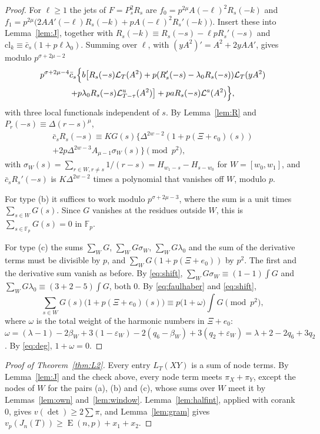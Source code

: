 \documentclass[11pt]{amsart}
\theoremstyle{definition}
\theoremstyle{remark}
\numberwithin{equation}{section}
\newcommand{\F}{\mathbb F}
\newcommand{\cL}{\mathcal L}
\newcommand{\Lex}{\operatorname{E}}
\begin{document}
\begin{proof}
For $\ell\ge1$ the jets of $F=P_s^2R_s$ are $f_0=p^{2\mu}A(-\ell)^2R_s(-k)$ and
$f_1=p^{2\mu}\bigl(2AA'(-\ell)R_s(-k)+pA(-\ell)^2R_s'(-k)\bigr)$. Insert these into Lemma~\ref{lem:J}, together with
$R_s(-k)\equiv R_s(-s)-\ell pR_s'(-s)$ and $\mathrm{cl}_k\equiv\bar c_s(1+p\ell\lambda_0)$. Summing over $\ell$, with
$(yA^2)'=A^2+2yAA'$, gives modulo $p^{\sigma+2\mu-2}$
\begin{multline*}
 p^{\sigma+2\mu-4}\bar c_s\Bigl\{b\bigl[R_s(-s)\cL_T(A^2)+p(R_s'(-s)-\lambda_0R_s(-s))\cL_T(yA^2)\\
 +p\lambda_0R_s(-s)\cL^u_{T-\tau}(A^2)\bigr]+paR_s(-s)\cL^a(A^2)\Bigr\},
\end{multline*}
with three local functionals independent of $s$. By Lemma~\ref{lem:R} and $P_r(-s)\equiv\Delta(r-s)^\mu$,
\begin{multline*}
 \bar c_sR_s(-s)\equiv KG(s)\bigl\{\Delta^{2w-2}(1+p(\Xi+e_0)(s))\\
 +2p\Delta^{2w-3}A_{\mu-1}\sigma_W(s)\bigr\}\pmod{p^2},
\end{multline*}
with $\sigma_W(s)=\sum_{r\in W,r\ne s}1/(r-s)=H_{w_1-s}-H_{s-w_0}$ for $W=[w_0,w_1]$, and $\bar c_sR_s'(-s)$ is $K\Delta^{2w-2}$
times a polynomial that vanishes off $W$, modulo $p$.

For type (b) it suffices to work modulo $p^{\sigma+2\mu-3}$, where the sum is a unit times $\sum_{s\in W}G(s)$. Since
$G$ vanishes at the residues outside $W$, this is $\sum_{s\in\F_p}G(s)=0$ in $\F_p$.

For type (c) the sums $\sum_WG$, $\sum_WG\sigma_W$, $\sum_WG\lambda_0$ and the sum of the derivative terms must be
divisible by $p$, and $\sum_WG(1+p(\Xi+e_0))$ by $p^2$. The first and the derivative sum vanish as before. By
\eqref{eq:shift}, $\sum_WG\sigma_W\equiv(1-1)\int G$ and $\sum_WG\lambda_0\equiv(3+2-5)\int G$, both $0$. By
\eqref{eq:faulhaber} and \eqref{eq:shift},
\[
 \sum_{s\in W}G(s)\bigl(1+p(\Xi+e_0)(s)\bigr)\equiv p\bigl(1+\omega\bigr)\int G\pmod{p^2},
\]
where $\omega$ is the total weight of the harmonic numbers in $\Xi+e_0$:
$\omega=(\lambda-1)-2\beta_W+3(1-\varepsilon_W)-2(q_6-\beta_W)+3(q_2+\varepsilon_W)=\lambda+2-2q_6+3q_2$. By \eqref{eq:deg},
$1+\omega=0$.
\end{proof}

\begin{proof}[Proof of Theorem~\textup{\ref{thm:L2}}]
Every entry $L_T(XY)$ is a sum of node terms. By Lemma~\ref{lem:J} and the check above, every node term meets
$\pi_X+\pi_Y$, except the nodes of $W$ for the pairs (a), (b) and (c), whose sums over $W$ meet it by
Lemmas~\ref{lem:own} and~\ref{lem:window}. Lemma~\ref{lem:halfint}, applied with corank $0$, gives
$v(\det)\ge2\sum\pi$, and Lemma~\ref{lem:gram} gives $v_p(J_n(T))\ge\Lex(n,p)+x_1+x_2$.
\end{proof}
\end{document}
